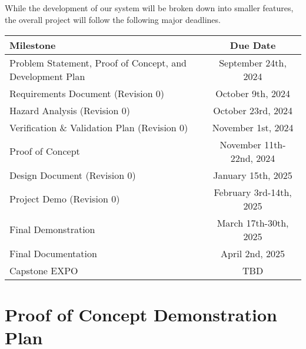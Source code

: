 \documentclass{article}
\begin{document}
\subsection*{\color{red}{Schedule}}
While the development of our system will be broken down into smaller features, the overall project will follow the following major deadlines.

\begin{center}
  \begin{tabularx}{\textwidth}{Xc}
    \toprule
    \textbf{Milestone} & \textbf{Due Date} \\
    \midrule
    Problem Statement, Proof of Concept, and Development Plan & September 24th, 2024 \\
    Requirements Document (Revision 0) & October 9th, 2024 \\
    Hazard Analysis (Revision 0) & October 23rd, 2024 \\
    Verification \& Validation Plan (Revision 0) & November 1st, 2024 \\
    Proof of Concept & November 11th-22nd, 2024 \\
    Design Document (Revision 0) & January 15th, 2025 \\
    Project Demo (Revision 0) & February 3rd-14th, 2025 \\
    Final Demonstration & March 17th-30th, 2025 \\
    Final Documentation & April 2nd, 2025 \\
    Capstone EXPO & TBD \\
    \bottomrule
  \end{tabularx}
\end{center}


\section{Proof of Concept Demonstration Plan}
\end{document}
